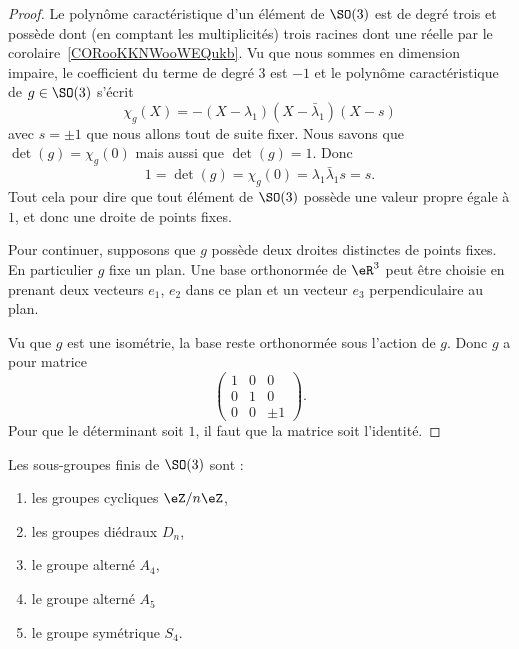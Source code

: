 \begin{proof}
    Le polynôme caractéristique d'un élément de \( \SO(3)\) est de degré trois et possède dont (en comptant les multiplicités) trois racines dont une réelle par le corolaire~\ref{CORooKKNWooWEQukb}. Vu que nous sommes en dimension impaire, le coefficient du terme de degré \( 3\) est \( -1\) et le polynôme caractéristique de \( g\in\SO(3)\) s'écrit
    \begin{equation}
        \chi_g(X)=-(X-\lambda_1)(X-\bar\lambda_1)(X-s)
    \end{equation}
    avec \( s=\pm1 \) que nous allons tout de suite fixer. Nous savons que \( \det(g)=\chi_g(0)\) mais aussi que \( \det(g)=1\). Donc
    \begin{equation}
        1=\det(g)=\chi_g(0)=\lambda_1\bar\lambda_1 s=s.
    \end{equation}
    Tout cela pour dire que tout élément de \( \SO(3)\) possède une valeur propre égale à \( 1\), et donc une droite de points fixes.

    Pour continuer, supposons que \( g\) possède deux droites distinctes de points fixes. En particulier \( g\) fixe un plan. Une base orthonormée de \( \eR^3\) peut être choisie en prenant deux vecteurs \( e_1\), \( e_2\) dans ce plan et un vecteur \( e_3\) perpendiculaire au plan.

    Vu que \( g\) est une isométrie, la base reste orthonormée sous l'action de \( g\). Donc \( g\) a pour matrice
    \begin{equation}
        \begin{pmatrix}
            1    &   0    &   0    \\
            0    &   1    &   0    \\
            0    &   0    &   \pm 1
        \end{pmatrix}.
    \end{equation}
    Pour que le déterminant soit \( 1\), il faut que la matrice soit l'identité.
\end{proof}

\begin{proposition}      \label{PROPooBHPNooHPlgwH}
    Les sous-groupes finis de \( \SO(3)\) sont :
    \begin{multicols}{2}
        \begin{enumerate}
            \item
                les groupes cycliques \( \eZ/n\eZ\),
            \item
                les groupes diédraux \( D_n\),
            \item
                le groupe alterné \( A_4\),
            \item
                le groupe alterné \( A_5\)
            \item
                le groupe symétrique \( S_4\).
        \end{enumerate}
    \end{multicols}
\end{proposition}

